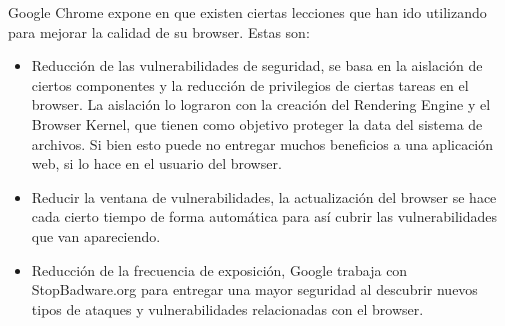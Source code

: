     Google Chrome expone en \cite{reis2009browser} que existen ciertas lecciones que han ido utilizando para mejorar la calidad de su browser. Estas son:

    \begin{itemize}
    	\item Reducción de las vulnerabilidades de seguridad, se basa en la aislación de ciertos componentes y la reducción de privilegios de ciertas tareas en el browser. La aislación lo lograron con la creación del Rendering Engine y el Browser Kernel, que tienen como objetivo proteger la data del sistema de archivos. Si bien esto puede no entregar muchos beneficios a una aplicación web, si lo hace en el usuario del browser.
    	\item Reducir la ventana de vulnerabilidades, la actualización del browser se hace cada cierto tiempo de forma automática para así cubrir las vulnerabilidades que van apareciendo.
    	\item Reducción de la frecuencia de exposición, Google trabaja con StopBadware.org para entregar una mayor seguridad al descubrir nuevos tipos de ataques y vulnerabilidades relacionadas con el browser.
    \end{itemize}









